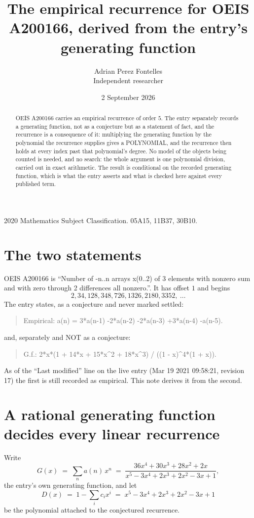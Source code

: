 \documentclass[11pt,a4paper]{article}
\title{The empirical recurrence for OEIS A200166, derived from the entry's generating function}
\author{Adrian Perez Fontelles\\ \small Independent researcher}
\date{2 September 2026}
\theoremstyle{plain}
\theoremstyle{definition}
\begin{document}
\maketitle

\begin{abstract}
OEIS A200166 carries an empirical recurrence of order $5$. The entry separately records a
generating function, not as a conjecture but as a statement of fact, and the recurrence is a
consequence of it: multiplying the generating function by the polynomial the recurrence
supplies gives a POLYNOMIAL, and the recurrence then holds at every index past that
polynomial's degree. No model of the objects being counted is needed, and no search: the
whole argument is one polynomial division, carried out in exact arithmetic. The result is
conditional on the recorded generating function, which is what the entry asserts and what is
checked here against every published term.
\end{abstract}

\noindent\small 2020 Mathematics Subject Classification. 05A15, 11B37, 30B10.\normalsize

\section{The two statements}

OEIS A200166 is ``Number of -n..n arrays x(0..2) of 3 elements with nonzero sum and with zero through 2 differences all nonzero.''. It has offset $1$ and begins
\[
2, 34, 128, 348, 726, 1326, 2180, 3352,\ \dots
\]
The entry states, as a conjecture and never marked settled:
\begin{quote}
Empirical: a(n) = 3*a(n-1) -2*a(n-2) -2*a(n-3) +3*a(n-4) -a(n-5).
\end{quote}
and, separately and NOT as a conjecture:
\begin{quote}
G.f.: 2*x*(1 + 14*x + 15*x\^{}2 + 18*x\^{}3) / ((1 - x)\^{}4*(1 + x)).
\end{quote}
As of the ``Last modified'' line on the live entry (Mar 19 2021 09:58:21, revision 17) the first is still
recorded as empirical. This note derives it from the second.

\section{A rational generating function decides every linear recurrence}

Write
\[
G(x)\;=\;\sum_{n}a(n)\,x^{n}\;=\;\frac{36 x^{4} + 30 x^{3} + 28 x^{2} + 2 x}{x^{5} - 3 x^{4} + 2 x^{3} + 2 x^{2} - 3 x + 1},
\]
the entry's own generating function, and let
\[
D(x)\;=\;1-\sum_i c_i x^{i}\;=\;x^{5} - 3 x^{4} + 2 x^{3} + 2 x^{2} - 3 x + 1
\]
be the polynomial attached to the conjectured recurrence.
\end{document}
